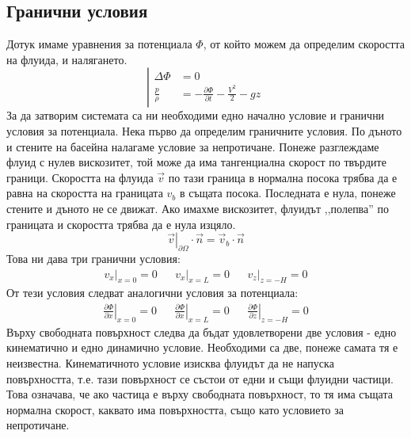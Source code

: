 \documentclass[12pt]{article}
\numberwithin{equation}{section}
\begin{document}
\subsection{Гранични условия}
Дотук имаме уравнения за потенциала $\Phi$, от който можем да определим скоростта на флуида, и налягането.
\begin{equation}
    \label{e:full-potential}
    \left|
    \begin{aligned}
        \Delta\Phi &= 0 \\
        \frac{p}{\rho} &= -\frac{\partial \Phi}{\partial t} - \frac{V^2}{2} - gz
    \end{aligned}
    \right.
\end{equation}
За да затворим системата са ни необходими едно начално условие и гранични условия за потенциала. Нека първо да определим граничните условия. По дъното и стените на басейна налагаме условие за непротичане. Понеже разглеждаме флуид с нулев вискозитет, той може да има тангенциална скорост по твърдите граници. Скоростта на флуида $\vec{v}$ по тази граница в нормална посока трябва да е равна на скоростта на границата $v_b$ в същата посока. Последната е нула, понеже стените и дъното не се движат. Ако имахме вискозитет, флуидът ,,полепва'' по границата и скоростта трябва да е нула изцяло.
\begin{equation}
    \label{e:slip-boundary-condition}
    \left. \vec{v} \right|_{\partial\Omega}\cdot\vec{n} = \vec{v}_b\cdot\vec{n}
\end{equation}
Това ни дава три гранични условия:
\begin{align}
    \left. v_x \right|_{x=0} = 0 &&
    \left. v_x \right|_{x=L} = 0 &&
    \left. v_z \right|_{z=-H} = 0
\end{align}
От тези условия следват аналогични условия за потенциала:
\begin{align}
    \label{e:boundary-conditions-1}
    \left. \frac{\partial \Phi}{\partial x} \right|_{x=0} = 0 &&
    \left. \frac{\partial \Phi}{\partial x} \right|_{x=L} = 0 &&
    \left. \frac{\partial \Phi}{\partial z} \right|_{z=-H} = 0
\end{align}
Върху свободната повърхност следва да бъдат удовлетворени две условия - едно кинематично и едно динамично условие. Необходими са две, понеже самата тя е неизвестна. Кинематичното условие изисква флуидът да не напуска повърхността, т.е. тази повърхност се състои от едни и същи флуидни частици. Това означава, че ако частица е върху свободната повърхност, то тя има същата нормална скорост, каквато има повърхността, също като условието за непротичане.
\end{document}
